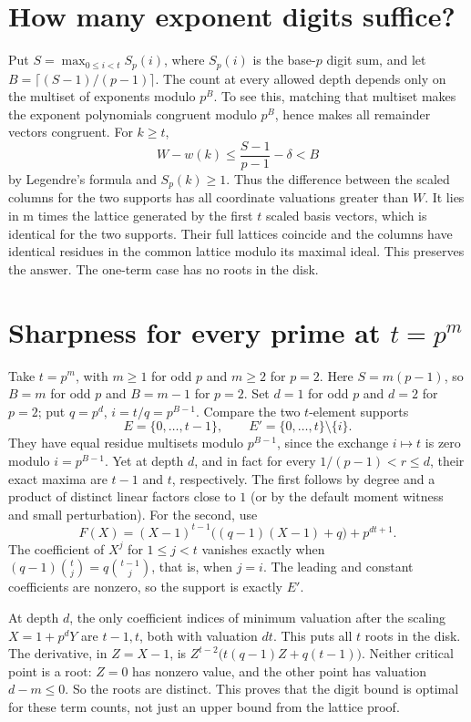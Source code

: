 \documentclass[11pt]{article}
\begin{document}
\section{How many exponent digits suffice?}
Put \(S=\max_{0\le i<t}S_p(i)\), where \(S_p(i)\) is the base-\(p\)
digit sum, and let \(B=\lceil(S-1)/(p-1)\rceil\).
The count at every allowed depth depends only on the multiset of
exponents modulo \(p^B\). To see this, matching that multiset makes
the exponent polynomials congruent modulo \(p^B\), hence makes all
remainder vectors congruent. For \(k\ge t\),
\[
 W-w(k)\le \frac{S-1}{p-1}-\delta < B
\]
by Legendre's formula and \(S_p(k)\ge1\).
Thus the difference between the scaled columns for the two supports
has all coordinate valuations greater than \(W\).
It lies in \(\mathrm m\) times the lattice generated by the first
\(t\) scaled basis vectors, which is identical for the two supports.
Their full lattices coincide and the columns have identical residues
in the common lattice modulo its maximal ideal. This preserves the
answer. The one-term case has no roots in the disk.
\newpage
\section{Sharpness for every prime at \(t=p^m\)}
Take \(t=p^m\), with \(m\ge1\) for odd \(p\) and \(m\ge2\) for \(p=2\).
Here \(S=m(p-1)\), so \(B=m\) for odd \(p\) and \(B=m-1\) for \(p=2\).
Set \(d=1\) for odd \(p\) and \(d=2\) for \(p=2\);
put \(q=p^d\), \(i=t/q=p^{B-1}\).
Compare the two \(t\)-element supports
\[
 E=\{0,\ldots,t-1\},\qquad E'=\{0,\ldots,t\}\setminus\{i\}.
\]
They have equal residue multisets modulo \(p^{B-1}\), since the exchange
\(i\mapsto t\) is zero modulo \(i=p^{B-1}\). Yet at depth \(d\),
and in fact for every \(1/(p-1)<r\le d\), their exact maxima
are \(t-1\) and \(t\), respectively. The first follows by degree
and a product of distinct linear factors close to \(1\) (or by the
default moment witness and small perturbation). For the second, use
\[
 F(X)=(X-1)^{t-1}\bigl((q-1)(X-1)+q\bigr)+p^{dt+1}.
\]
The coefficient of \(X^j\) for \(1\le j<t\) vanishes exactly when
\((q-1)\binom{t}{j}=q\binom{t-1}{j}\), that is, when \(j=i\).
The leading and constant coefficients are nonzero, so the support
is exactly \(E'\).

At depth \(d\), the only coefficient indices of minimum valuation
after the scaling \(X=1+p^dY\) are \(t-1,t\), both with valuation \(dt\).
This puts all \(t\) roots in the disk. The derivative, in \(Z=X-1\),
is \(Z^{t-2}\bigl(t(q-1)Z+q(t-1)\bigr)\). Neither critical point
is a root: \(Z=0\) has nonzero value, and the other point has
valuation \(d-m\le0\). So the roots are distinct.
This proves that the digit bound is optimal for these term counts,
not just an upper bound from the lattice proof.
\end{document}
